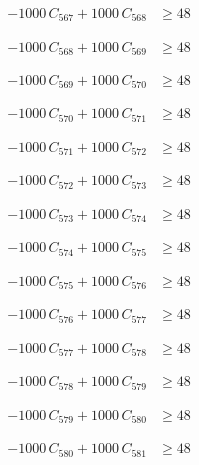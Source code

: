 \documentclass[a4paper,11pt]{article}
\begin{document}
\begin{align}
-1000\,C_{567} + 1000\,C_{568} &\geq 48 \nonumber
\end{align}

\begin{align}
-1000\,C_{568} + 1000\,C_{569} &\geq 48 \nonumber
\end{align}

\begin{align}
-1000\,C_{569} + 1000\,C_{570} &\geq 48 \nonumber
\end{align}

\begin{align}
-1000\,C_{570} + 1000\,C_{571} &\geq 48 \nonumber
\end{align}

\begin{align}
-1000\,C_{571} + 1000\,C_{572} &\geq 48 \nonumber
\end{align}

\begin{align}
-1000\,C_{572} + 1000\,C_{573} &\geq 48 \nonumber
\end{align}

\begin{align}
-1000\,C_{573} + 1000\,C_{574} &\geq 48 \nonumber
\end{align}

\begin{align}
-1000\,C_{574} + 1000\,C_{575} &\geq 48 \nonumber
\end{align}

\begin{align}
-1000\,C_{575} + 1000\,C_{576} &\geq 48 \nonumber
\end{align}

\begin{align}
-1000\,C_{576} + 1000\,C_{577} &\geq 48 \nonumber
\end{align}

\begin{align}
-1000\,C_{577} + 1000\,C_{578} &\geq 48 \nonumber
\end{align}

\begin{align}
-1000\,C_{578} + 1000\,C_{579} &\geq 48 \nonumber
\end{align}

\begin{align}
-1000\,C_{579} + 1000\,C_{580} &\geq 48 \nonumber
\end{align}

\begin{align}
-1000\,C_{580} + 1000\,C_{581} &\geq 48 \nonumber
\end{align}
\end{document}
